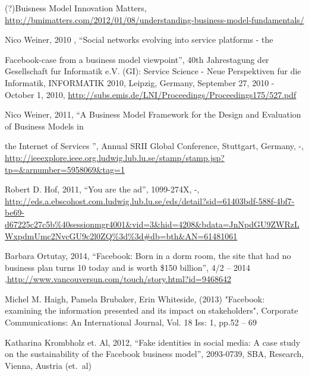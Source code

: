 \documentclass[conference]{IEEEtran}
\begin{document}
\begin{thebibliography}{1}
(?)Buisness Model Innovation Matters,
\href{http://bmimatters.com/2012/01/08/understanding-business-model-fundamentals/}{http://bmimatters.com/2012/01/08/understanding-business-model-fundamentals/}

Nico Weiner, 2010 , “Social networks evolving into service platforms - the

Facebook-case from a business model viewpoint”, 40th Jahrestagung der
Gesellschaft fur Informatik e.V. (GI): Service Science - Neue Perspektiven fur
die Informatik, INFORMATIK 2010, Leipzig, Germany, September 27, 2010 - October
1, 2010, \href{http://subs.emis.de/LNI/Proceedings/Proceedings175/527.pdf}{http://subs.emis.de/LNI/Proceedings/Proceedings175/527.pdf}

Nico Weiner, 2011, “A Business Model Framework for the Design and Evaluation of
Business Models in 

the Internet of Services ”, Annual SRII Global Conference, Stuttgart, Germany,
-,
\href{http://ieeexplore.ieee.org.ludwig.lub.lu.se/stamp/stamp.jsp?tp=\&arnumber=5958069\&tag=1}{http://ieeexplore.ieee.org.ludwig.lub.lu.se/stamp/stamp.jsp?tp=\&arnumber=5958069\&tag=1}

Robert D. Hof, 2011, “You are the ad”, 1099-274X, -,
\href{http://eds.a.ebscohost.com.ludwig.lub.lu.se/eds/detail?sid=61403bdf-588f-4bf7-be69-d67225c27c5b\%40sessionmgr4001\&vid=3\&hid=4208\&bdata=JnNpdGU9ZWRzLWxpdmUmc2NvcGU9c2l0ZQ\%3d\%3d\#db=bth\&AN=61481061}{http://eds.a.ebscohost.com.ludwig.lub.lu.se/eds/detail?sid=61403bdf-588f-4bf7-be69-d67225c27c5b\%40sessionmgr4001\&vid=3\&hid=4208\&bdata=JnNpdGU9ZWRzLWxpdmUmc2NvcGU9c2l0ZQ\%3d\%3d\#db=bth\&AN=61481061}

Barbara Ortutay, 2014, “Facebook: Born in a dorm room, the site that had no
business plan turns 10 today and is worth \$150 billion”, 4/2 – 2014
,\href{http://www.vancouversun.com/touch/story.html?id=9468642}{http://www.vancouversun.com/touch/story.html?id=9468642}

Michel M. Haigh, Pamela Brubaker, Erin Whiteside, (2013) "Facebook: examining
the information presented and its impact on stakeholders", Corporate
Communications: An International Journal, Vol. 18 Iss: 1, pp.52 – 69

Katharina Krombholz et. Al, 2012, “Fake identities in social media: A case
study on the sustainability of the Facebook business model”, 2093-0739, SBA,
Research, Vienna, Austria (et.\ al)


\end{thebibliography}
\end{document}
